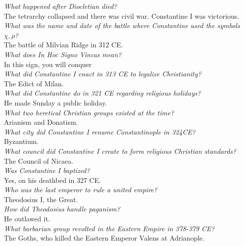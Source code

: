 \documentclass[12pt]{article}
\begin{document}
\textit{What happened after Diocletian died?}\\

The tetrarchy collapsed and there was civil war. Constantine I was victorious.\\

\textit{What was the name and date of the battle where Constantine used the symbols $\chi, \rho$?}\\
The battle of Milvian Ridge in 312 CE.\\

\textit{What does In Hoc Signo Vincas mean?}\\
In this sign, you will conquer\\

\textit{What did Constantine I enact in 313 CE to legalize Christianity?}\\
The Edict of Milan.\\

\textit{What did Constantine do in 321 CE regarding religious holidays?}\\
He made Sunday a public holiday.\\

\textit{What two heretical Christian groups existed at the time?}\\
Arianism and Donatism.\\

\textit{What city did Constantine I rename Constantinople in 324CE?}\\
Byzantium.\\

\textit{What council did Constantine I create to form religious Christian standards?}\\
The Council of Nicaea. \\

\textit{Was Constantine I baptized?}\\
Yes, on his deathbed in 327 CE.\\

\textit{Who was the last emperor to rule a united empire?}\\
Theodosius I, the Great.\\

\textit{How did Theodosius handle paganism?}\\
He outlawed it.\\

\textit{What barbarian group revolted in the Eastern Empire in 378-379 CE?}\\
The Goths, who killed the Eastern Emperor Valens at Adrianople.\\
\end{document}
